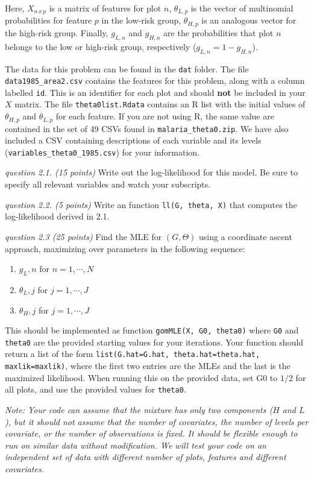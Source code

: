\documentclass[11pt]{article}
\begin{document}
Here, $X_{n \, x \, p}$ is a matrix of features for plot $n$, $\theta_{L,p}$ is the vector of multinomial probabilities for feature $p$ in the low-risk group, $\theta_{H,p}$ is an analogous vector for the high-risk group. Finally, $g_{L,n}$ and $g_{H,n}$ are the probabilities that plot $n$ belongs to the low or high-risk group, respectively ($g_{L,n} = 1 - g_{H,n}$).

The data for this problem can be found in the \texttt{dat} folder. The file \verb+data1985_area2.csv+ contains the features for this problem, along with a column labelled \texttt{id}. This is an identifier for each plot and should {\bf not} be included in your $X$ matrix. The file \verb+theta0list.Rdata+ contains an R list with the initial values of $\theta_{H,p}$ and $\theta_{L,p}$ for each feature. If you are not using R, the same value are contained in the set of 49 CSVs found in \verb+malaria_theta0.zip+. We have also included a CSV containing descriptions of each variable and its levels (\verb+variables_theta0_1985.csv+) for your information.

{\em question 2.1. (15 points)} Write out the log-likelihood for this model. Be sure to specify all relevant variables and watch your subscripts.

{\em question 2.2. (5 points)} Write an function \texttt{ll(G, theta, X)} that computes the log-likelihood derived in 2.1.

{\em question 2.3 (25 points)} Find the MLE for $(G, \Theta)$ using a coordinate ascent approach, maximizing over parameters in the following sequence:
\begin{enumerate}
 \item $g_L,n$ for $n=1,\cdots,N$
 \item $\theta_L,j$ for $j=1,\cdots,J$
 \item $\theta_H,j$ for $j=1,\cdots,J$
\end{enumerate}
This should be implemented as function \texttt{gomMLE(X, G0, theta0)} where \texttt{G0} and \texttt{theta0} are the provided starting values for your iterations. Your function should return a list of the form \texttt{list(G.hat=G.hat, theta.hat=theta.hat, maxlik=maxlik)}, where the first two entries are the MLEs and the last is the maximized likelihood. When running this on the provided data, set G0 to $1/2$ for all plots, and use the provided values for \verb+theta0+.

{\em Note: Your code can assume that the mixture has only two components ($H$ and $L$), but it should not assume that the number of covariates, the number of levels per covariate, or the number of observations is fixed. It should be flexible enough to run on similar data without modification. We will test your code on an independent set of data with different number of plots, features and different covariates.}
\end{document}

